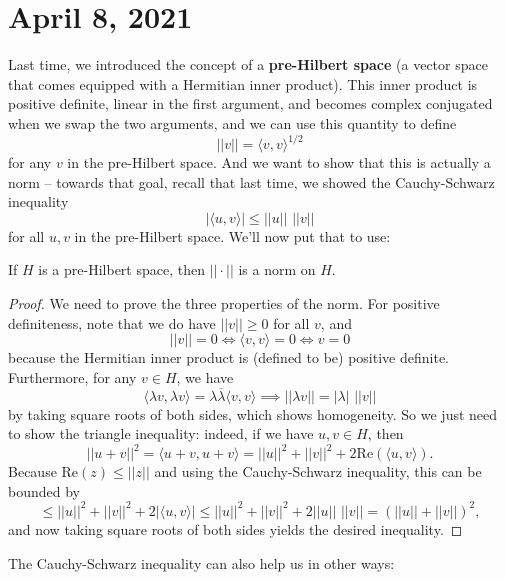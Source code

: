 \pagebreak\section{April 8, 2021}

Last time, we introduced the concept of a \textbf{pre-Hilbert space} (a vector space that comes equipped with a Hermitian inner product). This inner product is positive definite, linear in the first argument, and becomes complex conjugated when we swap the two arguments, and we can use this quantity to define 
\[
    ||v|| = \langle v, v \rangle^{1/2}
\]  
for any $v$ in the pre-Hilbert space. And we want to show that this is actually a norm -- towards that goal, recall that last time, we showed the Cauchy-Schwarz inequality
\[
    |\langle u, v \rangle| \le ||u|| \,\, ||v||
\]
for all $u, v$ in the pre-Hilbert space. We'll now put that to use:

\begin{theorem}
If $H$ is a pre-Hilbert space, then $||\cdot||$ is a norm on $H$.
\end{theorem}
\begin{proof}
We need to prove the three properties of the norm. For positive definiteness, note that we do have $||v|| \ge 0$ for all $v$, and
\[
    ||v|| = 0 \iff \langle v, v \rangle = 0 \iff v = 0
\]
because the Hermitian inner product is (defined to be) positive definite. Furthermore, for any $v \in H$, we have 
\[
    \langle \lambda v, \lambda v \rangle = \lambda \overline{\lambda} \langle v, v \rangle \implies ||\lambda v|| = |\lambda| \,\, ||v||
\]
by taking square roots of both sides, which shows homogeneity. So we just need to show the triangle inequality: indeed, if we have $u, v \in H$, then 
\[
    \boxed{||u+v||^2} = \langle u + v, u + v \rangle = ||u||^2 + ||v||^2 + 2 \text{Re}(\langle u, v \rangle).
\]
Because $\text{Re}(z) \le ||z||$ and using the Cauchy-Schwarz inequality, this can be bounded by 
\[
    \le ||u||^2 + ||v||^2 + 2|\langle u, v \rangle| \le ||u||^2 + ||v||^2 + 2||u||\,\,||v|| = \boxed{(||u|| + ||v||)^2},
\]
and now taking square roots of both sides yields the desired inequality. 
\end{proof}

The Cauchy-Schwarz inequality can also help us in other ways:

